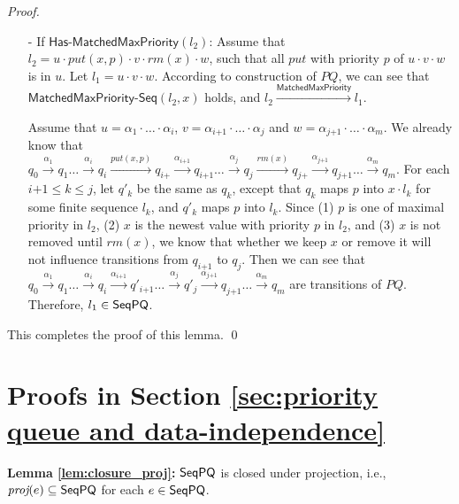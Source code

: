 \begin {proof}
\begin{itemize}
\item[-] If $\mathsf{Has\text{-}MatchedMaxPriority}(l_2)$: Assume that $l_2 = u \cdot \textit{put}(x,p) \cdot v \cdot \textit{rm}(x) \cdot w$, such that all $\textit{put}$ with priority $p$ of $u \cdot v \cdot w$ is in $u$. Let $l_1 = u \cdot v \cdot w$. According to construction of $\textit{PQ}$, we can see that $\mathsf{MatchedMaxPriority\text{-}Seq}(l_2,x)$ holds, and $l_2 \xrightarrow{\mathsf{MatchedMaxPriority}} l_1$.

    Assume that $u = \alpha_1 \cdot \ldots \cdot \alpha_i$, $v = \alpha_{\textit{i+1}} \cdot \ldots \cdot \alpha_j$ and $w = \alpha_{\textit{j+1}} \cdot \ldots \cdot \alpha_m$. We already know that $q_0 \xrightarrow{\alpha_1} q_1 \ldots \xrightarrow{\alpha_i} q_i \xrightarrow{\textit{put}(x,p)} q_{\textit{i+}} \xrightarrow{\alpha_{\textit{i+1}}} q_{\textit{i+1}} \ldots \xrightarrow{\alpha_j} q_j \xrightarrow{\textit{rm}(x)} q_{\textit{j+}} \xrightarrow{\alpha_{\textit{j+1}}} q_{\textit{j+1}} \ldots \xrightarrow{\alpha_m} q_m$. For each $\textit{i+1} \leq k \leq j$, let $q'_k$ be the same as $q_k$, except that $q_k$ maps $p$ into $x \cdot l_k$ for some finite sequence $l_k$, and $q'_k$ maps $p$ into $l_k$. Since (1) $p$ is one of maximal priority in $l_2$, (2) $x$ is the newest value with priority $p$ in $l_2$, and (3) $x$ is not removed until $\textit{rm}(x)$, we know that whether we keep $x$ or remove it will not influence transitions from $q_{\textit{i+1}}$ to $q_j$. Then we can see that $q_0 \xrightarrow{\alpha_1} q_1 \ldots \xrightarrow{\alpha_i} q_i \xrightarrow{\alpha_{\textit{i+1}}} q'_{\textit{i+1}} \ldots \xrightarrow{\alpha_j} q'_j \xrightarrow{\alpha_{\textit{j+1}}} q_{\textit{j+1}} \ldots \xrightarrow{\alpha_m} q_m$ are transitions of $\textit{PQ}$. Therefore, $l_1 \in \mathsf{SeqPQ}$.
\end{itemize}

This completes the proof of this lemma. \qed
\end {proof}






\section{Proofs in Section \ref{sec:priority queue and data-independence}}
\label{sec:appendix proofs in section priority queue and data-independence}


{\noindent \bf Lemma \ref{lem:closure_proj}:} $\mathsf{SeqPQ}$ is closed under projection, i.e., $\textit{proj}(e)\subseteq \mathsf{SeqPQ}$ for each $e\in \mathsf{SeqPQ}$.

